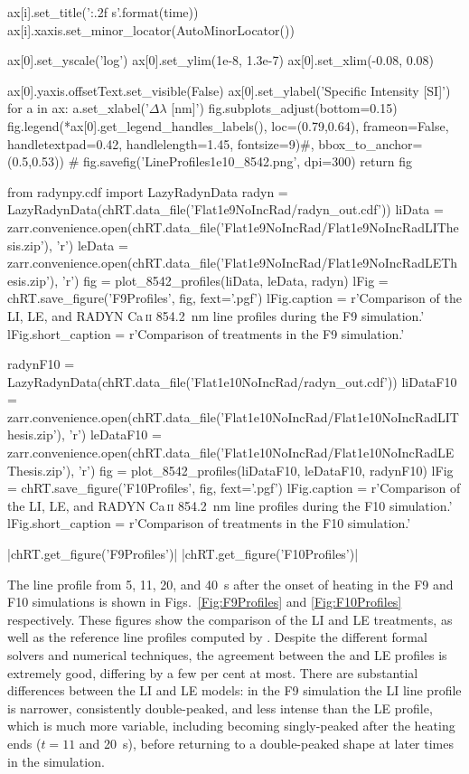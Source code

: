 \begin{pycode}[TimeDepRT]
        ax[i].set_title('{:.2f} s'.format(time))
        ax[i].xaxis.set_minor_locator(AutoMinorLocator())

    ax[0].set_yscale('log')
    ax[0].set_ylim(1e-8, 1.3e-7)
    ax[0].set_xlim(-0.08, 0.08)

    ax[0].yaxis.offsetText.set_visible(False)
    ax[0].set_ylabel('Specific Intensity [SI]')
    for a in ax:
        a.set_xlabel('$\Delta\lambda$ [nm]')
    fig.subplots_adjust(bottom=0.15)
    fig.legend(*ax[0].get_legend_handles_labels(), loc=(0.79,0.64), frameon=False,
               handletextpad=0.42, handlelength=1.45, fontsize=9)#, bbox_to_anchor=(0.5,0.53))
#     fig.savefig('LineProfiles1e10_8542.png', dpi=300)
    return fig

from radynpy.cdf import LazyRadynData
radyn = LazyRadynData(chRT.data_file('Flat1e9NoIncRad/radyn_out.cdf'))
liData = zarr.convenience.open(chRT.data_file('Flat1e9NoIncRad/Flat1e9NoIncRadLIThesis.zip'), 'r')
leData = zarr.convenience.open(chRT.data_file('Flat1e9NoIncRad/Flat1e9NoIncRadLEThesis.zip'), 'r')
fig = plot_8542_profiles(liData, leData, radyn)
lFig = chRT.save_figure('F9Profiles', fig, fext='.pgf')
lFig.caption = r'Comparison of the LI, LE, and RADYN Ca\,\textsc{ii} \SI{854.2}{\nano\metre} line profiles during the F9 simulation.'
lFig.short_caption = r'Comparison of \CaLine{} treatments in the F9 simulation.'

radynF10 = LazyRadynData(chRT.data_file('Flat1e10NoIncRad/radyn_out.cdf'))
liDataF10 = zarr.convenience.open(chRT.data_file('Flat1e10NoIncRad/Flat1e10NoIncRadLIThesis.zip'), 'r')
leDataF10 = zarr.convenience.open(chRT.data_file('Flat1e10NoIncRad/Flat1e10NoIncRadLEThesis.zip'), 'r')
fig = plot_8542_profiles(liDataF10, leDataF10, radynF10)
lFig = chRT.save_figure('F10Profiles', fig, fext='.pgf')
lFig.caption = r'Comparison of the LI, LE, and RADYN Ca\,\textsc{ii} \SI{854.2}{\nano\metre} line profiles during the F10 simulation.'
lFig.short_caption = r'Comparison of \CaLine{} treatments in the F10 simulation.'
\end{pycode}
\py[TimeDepRT]|chRT.get_figure('F9Profiles')|
\py[TimeDepRT]|chRT.get_figure('F10Profiles')|

The \CaLine{} line profile from 5, 11, 20, and \SI{40}{\second} after the onset of heating in the F9 and F10 simulations is shown in Figs.~\ref{Fig:F9Profiles} and \ref{Fig:F10Profiles} respectively.
These figures show the comparison of the LI and LE treatments, as well as the reference line profiles computed by \Radyn{}.
Despite the different formal solvers and numerical techniques, the agreement between the \Radyn{} and LE profiles is extremely good, differing by a few per cent at most.
There are substantial differences between the LI and LE models: in the F9 simulation the LI line profile is narrower, consistently double-peaked, and less intense than the LE profile, which is much more variable, including becoming singly-peaked after the heating ends ($t=11$ and \SI{20}{\second}), before returning to a double-peaked shape at later times in the simulation.

